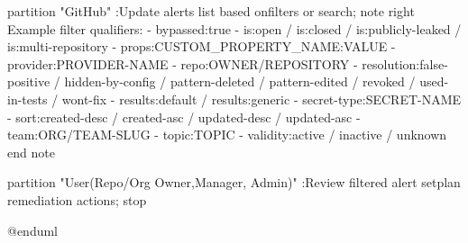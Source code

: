 partition "GitHub" {
  :Update alerts list based on\nselected filters or search\nqualifiers;
  note right
    Example filter qualifiers:
    - bypassed:true
    - is:open / is:closed /
      is:publicly-leaked /
      is:multi-repository
    - props:CUSTOM_PROPERTY_NAME:VALUE
    - provider:PROVIDER-NAME
    - repo:OWNER/REPOSITORY
    - resolution:false-positive /
      hidden-by-config /
      pattern-deleted /
      pattern-edited /
      revoked /
      used-in-tests /
      wont-fix
    - results:default / results:generic
    - secret-type:SECRET-NAME
    - sort:created-desc / created-asc /
      updated-desc / updated-asc
    - team:ORG/TEAM-SLUG
    - topic:TOPIC
    - validity:active / inactive / unknown
  end note
}

partition "User\n(Repo/Org Owner,\nSecurity Manager, Admin)" {
  :Review filtered alert set\nand plan remediation actions;
  stop
}

@enduml



